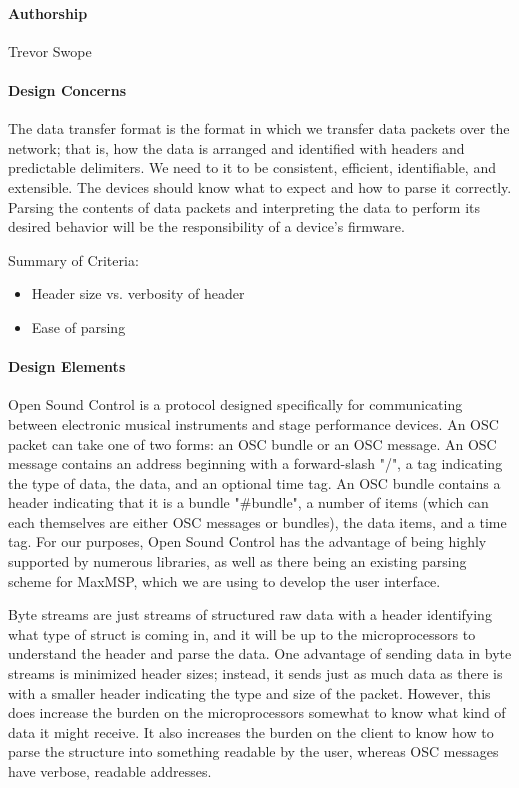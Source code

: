 \documentclass[onecolumn, draftclsnofoot,10pt, compsoc]{IEEEtran}
\begin{document}
\paragraph{Authorship}
Trevor Swope

\paragraph{Design Concerns}
The data transfer format is the format in which we transfer data packets over the network; that is, how the data is  arranged and identified with headers and predictable delimiters. We need to it to be consistent, efficient, identifiable, and extensible. The devices should know what to expect and how to parse it correctly. Parsing the contents of data packets and interpreting the data to perform its desired behavior will be the responsibility of a device's firmware. 

Summary of Criteria:
\begin{itemize}[noitemsep,topsep=-10pt]
    \item Header size vs. verbosity of header
    \item Ease of parsing
\end{itemize}

\paragraph{Design Elements}
Open Sound Control \cite{OSC} is a protocol designed specifically for communicating between electronic musical instruments and stage performance devices. An OSC packet can take one of two forms: an OSC bundle or an OSC message. An OSC message contains an address beginning with a forward-slash "/", a tag indicating the type of data, the data, and an optional time tag. An OSC bundle contains a header indicating that it is a bundle "\#bundle", a number of items (which can each themselves are either OSC messages or bundles), the data items, and a time tag. For our purposes, Open Sound Control has the advantage of being highly supported by numerous libraries, as well as there being an existing parsing scheme for MaxMSP, which we are using to develop the user interface.

Byte streams are just streams of structured raw data with a header identifying what type of struct is coming in, and it will be up to the microprocessors to understand the header and parse the data. One advantage of sending data in byte streams is minimized header sizes; instead, it sends just as much data as there is with a smaller header indicating the type and size of the packet. However, this does increase the burden on the microprocessors somewhat to know what kind of data it might receive. It also increases the burden on the client to know how to parse the structure into something readable by the user, whereas OSC messages have verbose, readable addresses.
\end{document}
